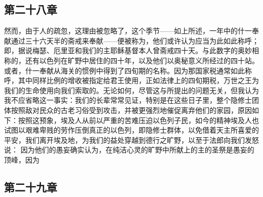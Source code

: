 
\subsection{第二十八章}

\par

然而，由于人的疏忽，这理由被忽略了，这个季节——如上所述，一年中的什一奉献通过三十六天半的斋戒来奉献——便被称为，他们或许认为应当为此如此称呼；即，据说梅瑟、厄里亚和我们的主耶稣基督本人曾斋戒四十天。与此数字的奥妙相称的，还有以色列在旷野中居住的四十年，以及他们以奥秘意义所经过的四十站。或者，什一奉献从海关的惯例中得到了四旬期的名称。因为那国家税通常如此称呼，其中同样比例的增收被指定给君王使用，正如法律上的四旬期税，万世之王为我们的生命使用向我们索取的。无论如何，尽管这与所提出的问题无关，但我认为我不应省略这一事实：我们的长辈常常见证，特别是在这些日子里，整个隐修士团体按照敌对民众的古老习俗受到攻击，并被更强烈地催促离弃他们的家园，原因如下：按照这预象，埃及人从前以严重的苦难压迫以色列子民，如今的精神埃及人也试图以艰难卑贱的劳作压倒真正的以色列，即隐修士群体，以免借着天主所喜爱的平安，我们离开埃及地，为我们的益处穿越到德行之旷野，以至于法郎向我们发怒说：  因为他们的愚妄确实认为，在纯洁心灵的旷野中所献上的主的圣祭是愚妄的顶峰，因为 \par


\subsection{第二十九章}

\par

